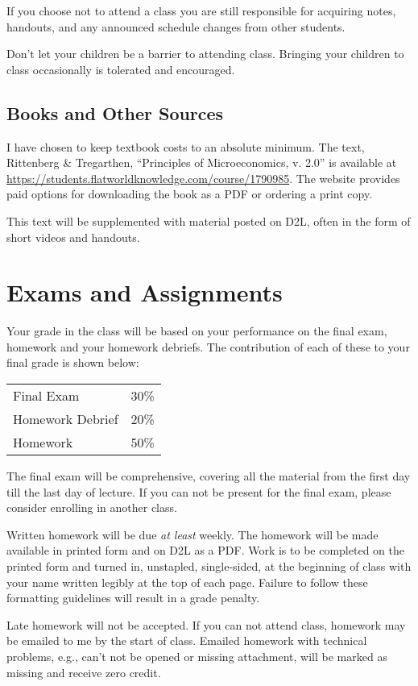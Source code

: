 \documentclass[letterpaper,10pt]{article}
\begin{document}
If you choose not to attend a class you are still responsible for
acquiring notes, handouts, and any announced schedule changes from
other students. 

Don't let your children be a barrier to attending class. Bringing your
children to class occasionally is tolerated and encouraged.

\subsection{Books and Other Sources}
I have chosen to keep textbook costs to an absolute minimum.  The text, Rittenberg \& Tregarthen, ``Principles of Microeconomics, v. 2.0'' is available at \url{https://students.flatworldknowledge.com/course/1790985}.  The website provides paid options for downloading the book as a PDF or ordering a print copy.

This text will be supplemented with material posted on D2L, often in the form of short videos and handouts.

\section{Exams and Assignments}

Your grade in the class will be based on your performance on the final
exam, homework and your homework debriefs. The contribution of each of these to your final grade is shown below:

\begin{tabular}{ll}
  Final Exam&30\%\\
  Homework Debrief&20\%\\
  Homework&50\%\\
\end{tabular} 

The final exam will be comprehensive, covering all the material from the first day till the last day of lecture. If you can not be present for the final exam, please consider enrolling in another class.

Written homework will be due \emph{at least} weekly.  The homework will be made available in printed form and on D2L as a PDF.  Work is to be completed on the printed form and turned in, unstapled, single-sided, at the beginning of class with your name written legibly at the top of each page. Failure to follow these formatting guidelines will result in a grade penalty.

Late homework will not be accepted.  If you can not attend class, homework may be emailed to me by the start of class. Emailed homework with technical problems, e.g., can't not be opened or missing attachment, will be marked as missing and receive zero credit.
\end{document}

